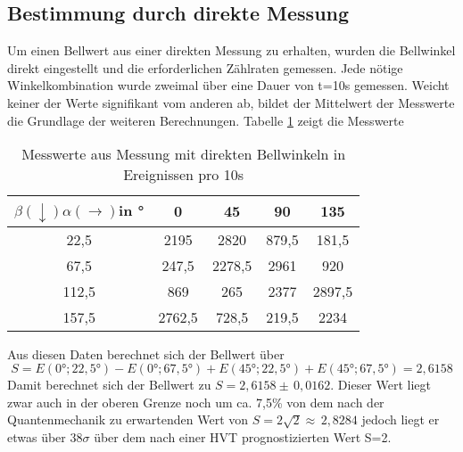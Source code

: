 \documentclass[twoside,colorback,accentcolor=tud4c,11pt]{tudreport}
\begin{document}
\subsection{Bestimmung durch direkte Messung}
Um einen Bellwert aus einer direkten Messung zu erhalten, wurden die Bellwinkel direkt eingestellt und die erforderlichen Zählraten gemessen. Jede nötige Winkelkombination wurde zweimal über eine Dauer von t=10s gemessen. Weicht keiner der Werte signifikant vom anderen ab, bildet der Mittelwert der Messwerte die Grundlage der weiteren Berechnungen. Tabelle \ref{bellwerte} zeigt die Messwerte
\begin{table}[H]
\renewcommand*{\arraystretch}{1.2}
\centering
\begin{tabular}{|c|c|c|c|c|}
\hline 
$\beta(\downarrow)\alpha(\rightarrow)$in ° & 0 & 45 & 90 & 135 \\ 
\hline 
22,5 & 2195 & 2820 & 879,5 & 181,5 \\ 
\hline 
67,5 & 247,5 & 2278,5 & 2961 & 920 \\ 
\hline 
112,5 & 869 & 265 & 2377 & 2897,5 \\ 
\hline 
157,5 & 2762,5 & 728,5 & 219,5 & 2234 \\ 
\hline 
\end{tabular} 
\caption{Messwerte aus Messung mit direkten Bellwinkeln in Ereignissen pro 10s}\label{bellwerte}
\end{table}
Aus diesen Daten berechnet sich der Bellwert über 
\begin{equation}
S=E(0°;22,5°)-E(0°;67,5°)+E(45°;22,5°)+E(45°;67,5°)=2,6158
\end{equation}
Damit berechnet sich der Bellwert zu $S=2,6158\pm\,0,0162$. Dieser Wert liegt zwar auch in der oberen Grenze noch um ca. 7,5\% von dem nach der Quantenmechanik zu erwartenden Wert von $S=2\sqrt{2}\approx\,2,8284$ jedoch liegt er etwas über $38\sigma$ über dem nach einer HVT prognostizierten Wert S=2.
\end{document}
